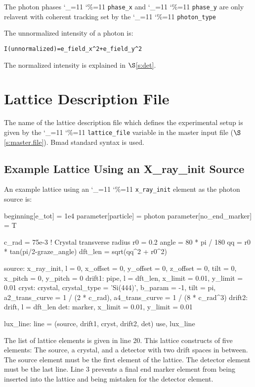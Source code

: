 \documentclass[11pt]{article}
\newcommand\ttcmd{\begingroup\catcode`\_=11 \catcode`\%=11 \dottcmd}
\newcommand\dottcmd[1]{\texttt{#1}\endgroup}
\newcommand{\vn}{\ttcmd}
\newcommand{\sref}[1]{$\S$\ref{#1}}
\newenvironment{example}
  {\vspace{\ExBeg} \begin{alltt}}
  {\end{alltt} \vspace{\ExEnd}}
\newlength{\ExBeg}
\newlength{\ExEnd}
\begin{document}
The photon phases \vn{phase_x} and \vn{phase_y} are only relavent with
coherent tracking set by the \vn{photon_type}

The unnormalized intensity of a photon is:
\begin{example}
  I(unnormalized) = e_field_x^2 + e_field_y^2
\end{example}
The normalized intensity is explained in \sref{s:det}.

\section{Lattice Description File}
\label{s:lat.file}

The name of the lattice description file which defines the
experimental setup is given by the \vn{lattice_file} variable in the
master input file (\sref{s:master.file}). Bmad standard syntax is
used\cite{b:bmad}. 

\subsection{Example Lattice Using an X_ray_init Source}
\label{s:spherical.lat}

An example lattice using an \vn{x_ray_init} element as the photon source is:
\begin{listing}{1}
beginning[e_tot] = 1e4
parameter[particle] = photon
parameter[no_end_marker] = T

c_rad = 75e-3  ! Crystal transverse radius 
r0 = 0.2
angle  = 80 * pi / 180
qq = r0 * tan(pi/2-graze_angle)
dft_len = sqrt(qq^2 + r0^2)

source: x_ray_init, l = 0, x_offset = 0, y_offset = 0, z_offset = 0, tilt = 0,
        x_pitch = 0, y_pitch = 0
drift1: pipe, l = dft_len, x_limit = 0.01, y_limit = 0.01
cryst: crystal, crystal_type = 'Si(444)', b_param = -1, tilt = pi, 
        a2_trans_curve = 1 / (2 * c_rad), a4_trans_curve = 1 / (8 * c_rad^3)
drift2: drift, l = dft_len
det: marker, x_limit = 0.01, y_limit = 0.01

lux_line: line = (source, drift1, cryst, drift2, det)
use, lux_line
\end{listing}

The list of lattice elements is given in line 20.  This lattice
constructs of five elements: The source, a crystal, and a detector
with two drift spaces in between. The source element must be the first
element of the lattice. The detector element must be the last
line. Line 3 prevents a final end marker element from being inserted
into the lattice and being mistaken for the detector element.
\end{document}
